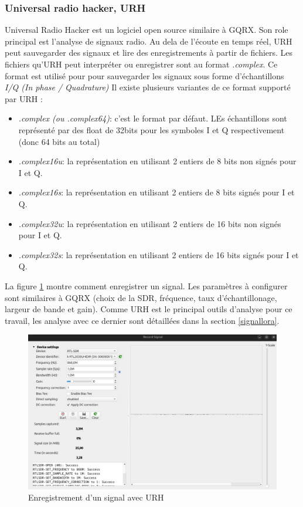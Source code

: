 \subsubsection{Universal radio hacker, URH}

Universal Radio Hacker est un logiciel open source similaire à GQRX. Son role principal est l'analyse de signaux radio. Au dela de l'écoute en temps réel, URH peut sauvegarder des signaux et lire des enregistrements à partir de fichiers. Les fichiers qu'URH peut interpréter ou enregistrer sont au format \textit{.complex}.  Ce format est utilisé pour pour sauvegarder les signaux sous forme d'échantillons \textit{I/Q (In phase / Quadrature)} Il existe plusieurs variantes de ce format supporté par URH :

\begin{itemize}
\item \textit{.complex (ou .complex64)}: c'est le format par défaut. LEs échantillons sont représenté par des float de 32bits pour les symboles I et Q respectivement (donc 64 bits au total)
 
\item  \textit{.complex16u}: la représentation en utilisant 2  entiers de 8 bits non signés pour I et Q.

\item  \textit{.complex16s}: la représentation en utilisant 2  entiers de 8 bits signés pour I et Q.

\item  \textit{.complex32u}: la représentation en utilisant 2  entiers de 16 bits non signés pour I et Q. 

\item  \textit{.complex32s}: la représentation en utilisant 2 entiers de 16 bits signés pour I et Q.
\end{itemize}

La figure \ref{term39} montre comment enregistrer un signal. Les paramètres à configurer sont similaires à GQRX (choix de la SDR, fréquence, taux d'échantillonage, largeur de bande et gain). Comme URH est le principal outils d'analyse pour ce travail, les analyse avec ce dernier sont détaillées dans la section \ref{signallora}.

\begin{figure}[h]
\centering

\includegraphics[scale=0.2]{images/urh1.png}
\caption{Enregistrement d'un signal avec URH}\label{term39}
\end{figure}



